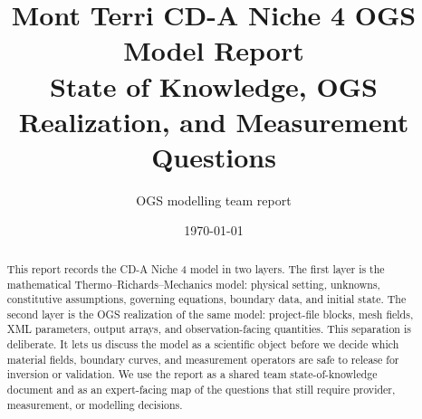 \documentclass[11pt,a4paper]{report}
\title{Mont Terri CD-A Niche 4 OGS Model Report\\
\large State of Knowledge, OGS Realization, and Measurement Questions}
\author{OGS modelling team report}
\date{\today}
\begin{document}
\hypersetup{pageanchor=false}
\maketitle

\begin{abstract}
This report records the CD-A Niche 4 model in two layers.  The first layer is the
mathematical Thermo--Richards--Mechanics model: physical setting, unknowns,
constitutive assumptions, governing equations, boundary data, and initial state.
The second layer is the OGS realization of the same model: project-file blocks,
mesh fields, XML parameters, output arrays, and observation-facing quantities.
This separation is deliberate.  It lets us discuss the model as a scientific object
before we decide which material fields, boundary curves, and measurement operators
are safe to release for inversion or validation.  We use the report as a shared
team state-of-knowledge document and as an expert-facing map of the questions that
still require provider, measurement, or modelling decisions.
\end{abstract}

\clearpage
\hypersetup{pageanchor=true}
\tableofcontents

\clearpage
{}



\ifreviewchanges


\fi



\end{document}
